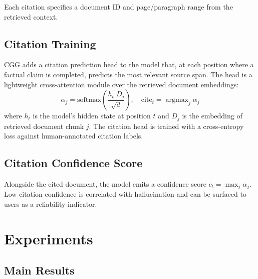 \documentclass[11pt,a4paper]{article}
\begin{document}
Each citation specifies a document ID and page/paragraph range from the retrieved context.

\subsection{Citation Training}

CGG adds a citation prediction head to the model that, at each position where a factual
claim is completed, predicts the most relevant source span. The head is a lightweight
cross-attention module over the retrieved document embeddings:
\begin{equation}
    \alpha_j = \text{softmax}\!\left(\frac{h_t^\top D_j}{\sqrt{d}}\right), \quad
    \text{cite}_t = \operatorname{argmax}_j \alpha_j
    \label{eq:cite}
\end{equation}
where $h_t$ is the model's hidden state at position $t$ and $D_j$ is the embedding of
retrieved document chunk $j$. The citation head is trained with a cross-entropy loss
against human-annotated citation labels.

\subsection{Citation Confidence Score}

Alongside the cited document, the model emits a confidence score $c_t = \max_j \alpha_j$.
Low citation confidence is correlated with hallucination and can be surfaced to users
as a reliability indicator.

\section{Experiments}
\label{sec:experiments}

\subsection{Main Results}
\end{document}

